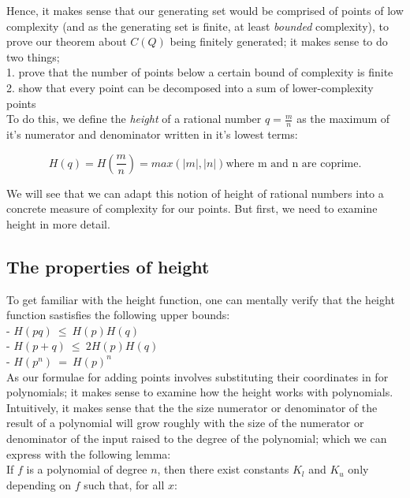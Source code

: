\documentclass{article}
\begin{document}
Hence, it makes sense that our generating set would be comprised of points of low complexity (and as the generating set is finite, at least \emph{bounded} complexity), to prove our theorem about $C(Q)$ being finitely generated; it makes sense to do two things;\\

1. prove that the number of points below a certain bound of complexity is finite \\

2. show that every point can be decomposed into a sum of lower-complexity points \\

To do this, we define the \emph{height} of a rational number $q = \frac{m}{n}$ as the maximum of it's numerator and denominator written in it's lowest terms:

\[ H(q) = H\left(\frac{m}{n}\right) = max(|m|, |n|) \text{where m and n are coprime.} \]

We will see that we can adapt this notion of height of rational numbers into a concrete measure of complexity for our points. But first, we need to examine height in more detail.

\subsection{The properties of height}

To get familiar with the height function, one can mentally verify that the height function sastisfies the following upper bounds:\\

- $ H(pq) \ \leq \ H(p)H(q) $\\

- $ H(p + q) \ \leq \ 2H(p)H(q) $\\

- $ H(p^n) \ = \ H(p)^n $ \\

As our formulae for adding points involves substituting their coordinates in for polynomials; it makes sense to examine how the height works with polynomials. Intuitively, it makes sense that the the size numerator or denominator of the result of a polynomial will grow roughly with the size of the numerator or denominator of the input raised to the degree of the polynomial; which we can express with the following lemma:\\

If $f$ is a polynomial of degree $n$, then there exist constants $K_l$ and $K_u$ only depending on $f$ such that, for all $x$:
\end{document}
